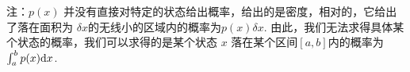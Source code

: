 注：$p(x)$ 并没有直接对特定的状态给出概率，给出的是密度，相对的，它给出了落在面积为 $\delta x$的无线小的区域内的概率为$p(x)\delta x$. 由此，我们无法求得具体某个状态的概率，我们可以求得的是某个状态 $x$ 落在某个区间$[a,b]$内的概率为$\int_{a}^{b}p(x)\mathrm{d}x$.

%
%
%
%
%
%
%
%
%
%
%

